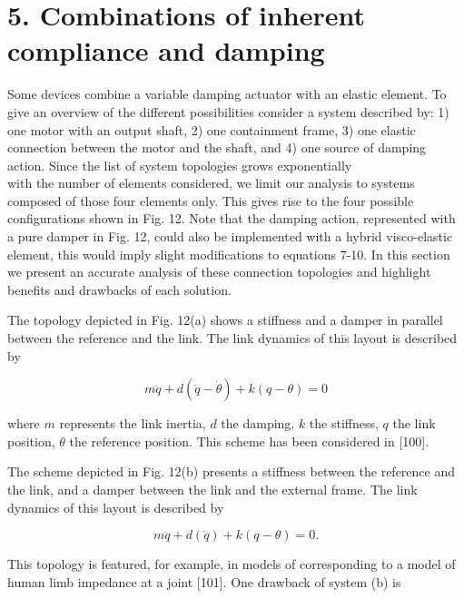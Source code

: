 \documentclass[10pt]{article}
\begin{document}
\section*{5. Combinations of inherent compliance and damping}
Some devices combine a variable damping actuator with an elastic element. To give an overview of the different possibilities consider a system described by: 1) one motor with an output shaft, 2) one containment frame, 3) one elastic connection between the motor and the shaft, and 4) one source of damping action. Since the list of system topologies grows exponentially\\
with the number of elements considered, we limit our analysis to systems composed of those four elements only. This gives rise to the four possible configurations shown in Fig. 12. Note that the damping action, represented with a pure damper in Fig. 12, could also be implemented with a hybrid visco-elastic element, this would imply slight modifications to equations 7-10. In this section we present an accurate analysis of these connection topologies and highlight benefits and drawbacks of each solution.

The topology depicted in Fig. 12(a) shows a stiffness and a damper in parallel between the reference and the link. The link dynamics of this layout is described by


\begin{equation*}
m \ddot{q}+d(\dot{q}-\dot{\theta})+k(q-\theta)=0 \tag{7}
\end{equation*}


where $m$ represents the link inertia, $d$ the damping, $k$ the stiffness, $q$ the link position, $\theta$ the reference position. This scheme has been considered in [100].

The scheme depicted in Fig. 12(b) presents a stiffness between the reference and the link, and a damper between the link and the external frame. The link dynamics of this layout is described by


\begin{equation*}
m \ddot{q}+d(\dot{q})+k(q-\theta)=0 . \tag{8}
\end{equation*}


This topology is featured, for example, in models of corresponding to a model of human limb impedance at a joint [101]. One drawback of system (b) is
\end{document}
